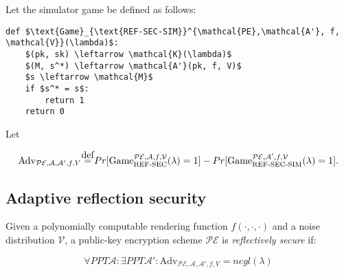 \documentclass{article}
\newcommand\defeq{\stackrel{\mathclap{\normalfont\mbox{def}}}{=}}
\begin{document}
Let the simulator game be defined as follows:

\begin{lstlisting}[texcl,mathescape]
def $\text{Game}_{\text{REF-SEC-SIM}}^{\mathcal{PE},\mathcal{A'}, f,
\mathcal{V}}(\lambda)$:
    $(pk, sk) \leftarrow \mathcal{K}(\lambda)$
    $(M, s^*) \leftarrow \mathcal{A'}(pk, f, V)$
    $s \leftarrow \mathcal{M}$
    if $s^* = s$:
        return 1
    return 0
\end{lstlisting}

Let

\begin{equation*}
    \text{Adv}_{\mathcal{PE}, \mathcal{A}, \mathcal{A}', f, V}
    \defeq
    Pr[\text{Game}_{\text{REF-SEC}}^{\mathcal{PE},\mathcal{A}, f,
\mathcal{V}}(\lambda) = 1]
    -
    Pr[\text{Game}_{\text{REF-SEC-SIM}}^{\mathcal{PE},\mathcal{A'}, f,
\mathcal{V}}(\lambda) = 1].
\end{equation*}

\subsection*{Adaptive reflection security}

Given a polynomially computable rendering function $f(\cdot, \cdot, \cdot)$ and
a  noise distribution $\mathcal{V}$, a public-key encryption scheme
$\mathcal{PE}$ is \textit{reflectively secure} if:

\begin{equation*}
\forall PPT \mathcal{A}: \exists PPT \mathcal{A}': \text{Adv}_{\mathcal{PE}, \mathcal{A}, \mathcal{A}', f, V} = negl(\lambda)
\end{equation*}
\end{document}
